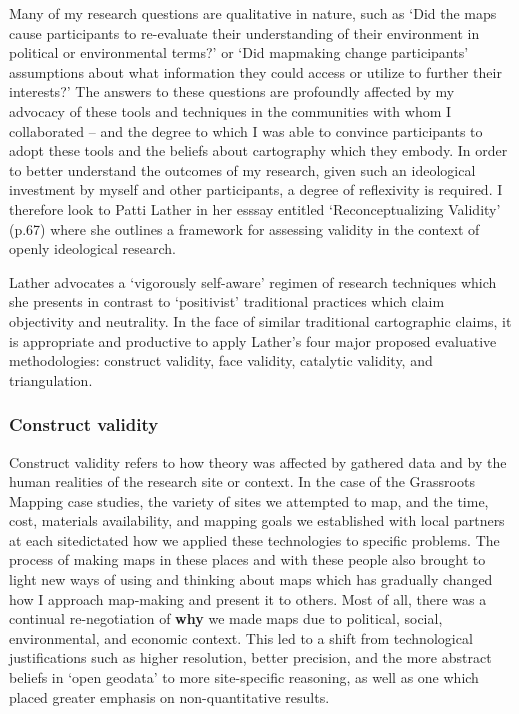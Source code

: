 \documentclass[11pt]{report}
\begin{document}
Many of my research questions are qualitative in nature, such as `Did the maps cause participants to re-evaluate their understanding of their environment in political or environmental terms?' or `Did mapmaking change participants' assumptions about what information they could access or utilize to further their interests?' The answers to these questions are profoundly affected by my advocacy of these tools and techniques in the communities with whom I collaborated -- and the degree to which I was able to convince participants to adopt these tools and the beliefs about cartography which they embody. In order to better understand the outcomes of my research, given such an ideological investment by myself and other participants, a degree of reflexivity is required. I therefore look to Patti Lather in her esssay entitled `Reconceptualizing Validity' (p.67) where she outlines a framework for assessing validity in the context of openly ideological research.  

Lather advocates a `vigorously self-aware' regimen of research techniques which she presents in contrast to `positivist' traditional practices which claim objectivity and neutrality. In the face of similar traditional cartographic claims, it is appropriate and productive to apply Lather's four major proposed evaluative methodologies: construct validity, face validity, catalytic validity, and triangulation. 

\subsubsection{Construct validity}

Construct validity refers to how theory was affected by gathered data and by the human realities of the research site or context. In the case of the Grassroots Mapping case studies, the variety of sites we attempted to map, and the time, cost, materials availability, and mapping goals we established with local partners at each sitedictated how we applied these technologies to specific problems. The process of making maps in these places and with these people also brought to light new ways of using and thinking about maps which has gradually changed how I approach map-making and present it to others. Most of all, there was a continual re-negotiation of \textbf{why} we made maps due to political, social, environmental, and economic context. This led to a shift from technological justifications such as higher resolution, better precision, and the more abstract beliefs in `open geodata' to more site-specific reasoning, as well as one which placed greater emphasis on non-quantitative results.  
\end{document}
